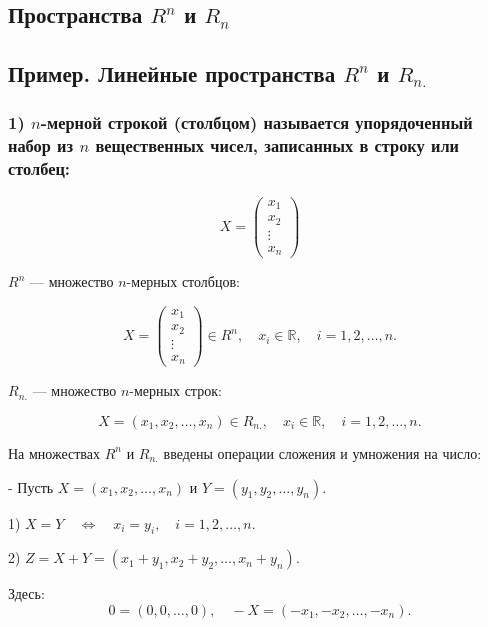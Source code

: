 {
\subsection{Пространства \(R^n\) и \(R_n\)}
\subsection*{Пример. Линейные пространства \( R^n \) и \( R_{n.} \)}

\subsubsection*{1) \( n \)-мерной строкой (столбцом) называется упорядоченный набор из \( n \) вещественных чисел, записанных в строку или столбец:}



\[
X = \begin{pmatrix} x_1 \\ x_2 \\ \vdots \\ x_n \end{pmatrix}
\]



\( R^n \) — множество \( n \)-мерных столбцов:



\[
X = \begin{pmatrix} x_1 \\ x_2 \\ \vdots \\ x_n \end{pmatrix} \in R^n, \quad x_i \in \mathbb{R}, \quad i = 1, 2, \dots, n.
\]



\( R_{n.} \) — множество \( n \)-мерных строк:



\[
X = ( x_1, x_2, \dots, x_n ) \in R_{n.}, \quad x_i \in \mathbb{R}, \quad i = 1, 2, \dots, n.
\]



На множествах \( R^n \) и \( R_{n.} \) введены операции сложения и умножения на число:

- Пусть \( X = ( x_1, x_2, \dots, x_n ) \) и \( Y = ( y_1, y_2, \dots, y_n ) \).

  1) \( X = Y \quad \Leftrightarrow \quad x_i = y_i, \quad i = 1, 2, \dots, n \).
  
  2) \( Z = X + Y = ( x_1 + y_1, x_2 + y_2, \dots, x_n + y_n ) \).

     Здесь:
\[
     0 = (0, 0, \dots, 0), \quad -X = (-x_1, -x_2, \dots, -x_n).
\]

}
